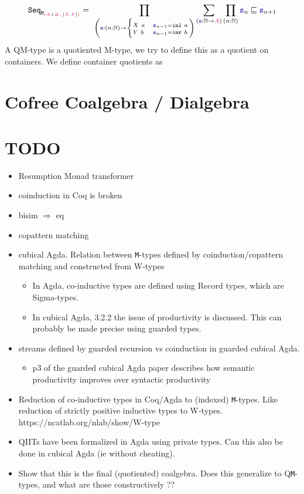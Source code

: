 \documentclass[twoside,11pt,openright]{report}
\theoremstyle{plain} %
\theoremstyle{definition}
\theoremstyle{remark}
\newcommand*{\type}[1]{\textcolor{magenta!90!black}{#1}}
\newcommand*{\containerpair}[2]{\textcolor{red}{(}#1\,\textcolor{red}{,}\,#2\textcolor{red}{)}}
\newcommand*{\function}[1]{\textcolor{blue!60!black}{\ensuremath{\mathtt{#1}}}}
\newcommand*{\typeformer}[1]{\ensuremath{\mathtt{#1}}}
\begin{document}
\begin{align}
  \typeformer{Seq}_{\typeformer{M}_{\containerpair{\type{A} + \type{B}}{[\type{X} , \type{Y}]}}} &=~\prod_{\left(\function{e} : (n : \mathbb{N}) \rightarrow {\begin{cases}  {\scriptstyle  X~a} & {\scriptstyle  \function{s}_{n-1} = \mathtt{inl}~a} \\[-2mm] {\scriptstyle  Y~b} & {\scriptstyle  \function{s}_{n-1} = \mathtt{inr}~b} \end{cases}}\right)}\sum_{(\function{s} : \mathbb{N} \rightarrow \type{A})}\prod_{(n : \mathbb{N})} \function{s}_n \sqsubseteq \function{s}_{n+1} \\
\end{align}
A QM-type is a quotiented M-type, we try to define this as a quotient on containers. We define container quotients as

\section{Cofree Coalgebra / Dialgebra}

\newpage
\section{TODO}
\begin{itemize}
\item Resumption Monad transformer
\item coinduction in Coq is broken
\item bisim \(\Rightarrow\) eq
\item copattern matching
\item cubical Agda. Relation between \texttt{M}-types defined by coinduction/copattern matching and constructed from W-types
  \begin{itemize}
  \item In Agda, co-inductive types are defined using Record types, which are Sigma-types.
  \item In cubical Agda, 3.2.2 the issue of productivity is discussed. This can probably be made precise using guarded types.
\end{itemize}
\item streams defined by guarded recursion vs coinduction in guarded cubical Agda. 
  \begin{itemize}
  \item p3 of the guarded cubical Agda paper describes how semantic productivity improves over syntactic productivity
\end{itemize}
\item Reduction of co-inductive types in Coq/Agda to (indexed) \texttt{M}-types. Like reduction of strictly positive inductive types to W-types. https://ncatlab.org/nlab/show/W-type
\item QIITs have been formalized in Agda using private types. Can this also be done in cubical Agda (ie without cheating).
\item   Show that this is the final (quotiented) coalgebra. Does this generalize to Q\texttt{M}-types, and what are those constructively ??
\end{itemize}
\end{document}

